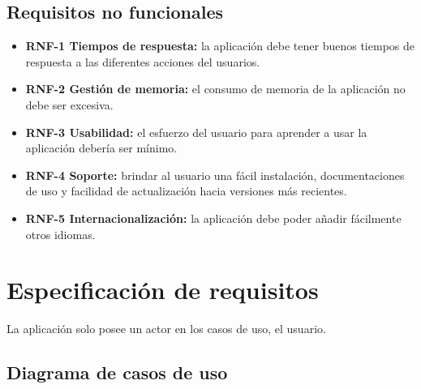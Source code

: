 \subsection{Requisitos no funcionales}

\begin{itemize}
	\item \textbf{RNF-1 Tiempos de respuesta:} la aplicación debe tener buenos tiempos de respuesta a las diferentes acciones del usuarios. 
	\item \textbf{RNF-2 Gestión de memoria:} el consumo de memoria de la aplicación no debe ser excesiva.
	\item \textbf{RNF-3 Usabilidad:} el esfuerzo del usuario para aprender a usar la aplicación debería ser mínimo.
	\item \textbf{RNF-4 Soporte:} brindar al usuario una fácil instalación, documentaciones de uso y facilidad de actualización hacia versiones más recientes.
	\item \textbf{RNF-5 Internacionalización:} la aplicación debe poder añadir fácilmente otros idiomas.
\end{itemize}


\section{Especificación de requisitos}
La aplicación solo posee un actor en los casos de uso, el usuario.
\subsection{Diagrama de casos de uso}
